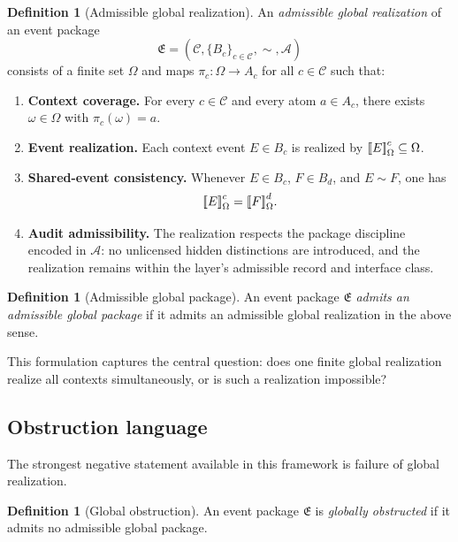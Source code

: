 \documentclass[11pt]{article}
\newcommand{\EventPackage}{\mathfrak{E}}
\newcommand{\llbracket}{\mathopen{[\mkern-3mu[}}
\newcommand{\rrbracket}{\mathclose{]\mkern-3mu]}}
\theoremstyle{definition}
\newtheorem{definition}[theorem]{Definition}
\begin{document}
\begin{definition}[Admissible global realization]
An \emph{admissible global realization} of an event package
\[
\EventPackage=(\mathcal C,\{B_c\}_{c\in\mathcal C},\sim,\mathcal A)
\]
consists of a finite set \(\Omega\) and maps \(\pi_c:\Omega\to A_c\) for all \(c\in\mathcal C\) such that:
\begin{enumerate}
    \item \textbf{Context coverage.} For every \(c\in\mathcal C\) and every atom \(a\in A_c\), there exists \(\omega\in\Omega\) with \(\pi_c(\omega)=a\).
    \item \textbf{Event realization.} Each context event \(E\in B_c\) is realized by \(\llbracket E \rrbracket_\Omega^c\subseteq \Omega\).
    \item \textbf{Shared-event consistency.} Whenever \(E\in B_c\), \(F\in B_d\), and \(E\sim F\), one has
    \[
    \llbracket E \rrbracket_\Omega^c = \llbracket F \rrbracket_\Omega^d.
    \]
    \item \textbf{Audit admissibility.} The realization respects the package discipline encoded in \(\mathcal A\): no unlicensed hidden distinctions are introduced, and the realization remains within the layer's admissible record and interface class.
\end{enumerate}
\end{definition}

\begin{definition}[Admissible global package]
An event package \(\EventPackage\) \emph{admits an admissible global package} if it admits an admissible global realization in the above sense.
\end{definition}

This formulation captures the central question: does one finite global realization realize all contexts simultaneously, or is such a realization impossible?

\subsection{Obstruction language}

The strongest negative statement available in this framework is failure of global realization.

\begin{definition}[Global obstruction]
An event package \(\EventPackage\) is \emph{globally obstructed} if it admits no admissible global package.
\end{definition}
\end{document}
